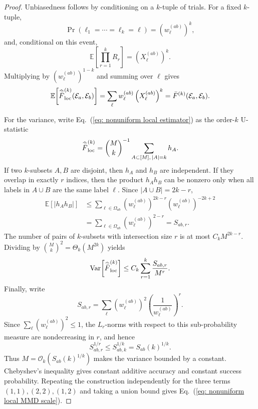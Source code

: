 \documentclass[aps,prx,reprint,superscriptaddress,amsmath,amssymb,longbibliography,floatfix]{revtex4-2}
\newcommand{\dsE}{\mathbb{E}}
\newcommand{\scE}{\mathcal{E}}
\newcommand{\scO}{\mathcal{O}}
\theoremstyle{plain}
\theoremstyle{definition}
\theoremstyle{remark}
\begin{document}
\begin{proof}
Unbiasedness follows by conditioning on a \(k\)-tuple of trials. For a fixed \(k\)-tuple,
\[
    \Pr(\ell_1=\cdots=\ell_k=\ell)=(w_\ell^{(ab)})^k,
\]
and, conditional on this event,
\[
    \dsE\!\left[\prod_{r=1}^k R_r\right]
    =
    \left(X_\ell^{(ab)}\right)^k .
\]
Multiplying by \((w_\ell^{(ab)})^{1-k}\) and summing over \(\ell\) gives
\[
    \dsE\!\left[
        \widehat{\bar F}^{(k)}_{\rm loc}(\scE_a,\scE_b)
    \right]
    =
    \sum_\ell w_\ell^{(ab)}
    \left(X_\ell^{(ab)}\right)^k
    =
    \bar F^{(k)}(\scE_a,\scE_b).
\]

For the variance, write Eq.~(\ref{eq: nonuniform local estimator}) as the order-\(k\) U-statistic
\[
    \widehat{\bar F}^{(k)}_{\rm loc}
    =
    \binom{M}{k}^{-1}
    \sum_{A\subset[M],\,|A|=k} h_A .
\]
If two \(k\)-subsets \(A,B\) are disjoint, then \(h_A\) and \(h_B\) are independent. If they overlap in exactly \(r\) indices, then the product \(h_Ah_B\) can be nonzero only when all labels in \(A\cup B\) are the same label \(\ell\). Since \(|A\cup B|=2k-r\),
\begin{equation}
\begin{aligned}
\dsE[|h_Ah_B|]
    &\le
    \sum_{\ell\in\Omega_{ab}}
    (w_\ell^{(ab)})^{2k-r}
    (w_\ell^{(ab)})^{-2k+2}\\
    &=
    \sum_{\ell\in\Omega_{ab}}
    (w_\ell^{(ab)})^{2-r}
    =
    S_{ab,r}.
\end{aligned}
\label{eq:app-nonuniform-local-overlap-moment}
\end{equation}
The number of pairs of \(k\)-subsets with intersection size \(r\) is at most \(C_kM^{2k-r}\). Dividing by \(\binom{M}{k}^2=\Theta_k(M^{2k})\) yields
\[
    \operatorname{Var}\!\left[
        \widehat{\bar F}^{(k)}_{\rm loc}
    \right]
    \le
    C_k
    \sum_{r=1}^k
    \frac{S_{ab,r}}{M^r}.
\]
Finally, write
\[
    S_{ab,r}
    =
    \sum_{\ell}
    (w_\ell^{(ab)})^2
    \left(\frac1{w_\ell^{(ab)}}\right)^r.
\]
Since \(\sum_\ell (w_\ell^{(ab)})^2\le 1\), the \(L_r\)-norms with respect to this sub-probability measure are nondecreasing in \(r\), and hence
\[
    S_{ab,r}^{1/r}\le S_{ab,k}^{1/k}=S_{ab}(k)^{1/k}.
\]
Thus \(M=\scO_k(S_{ab}(k)^{1/k})\) makes the variance bounded by a constant. Chebyshev's inequality gives constant additive accuracy and constant success probability. Repeating the construction independently for the three terms \((1,1),(2,2),(1,2)\) and taking a union bound gives Eq.~(\ref{eq: nonuniform local MMD scale}).
\end{proof}
\end{document}
